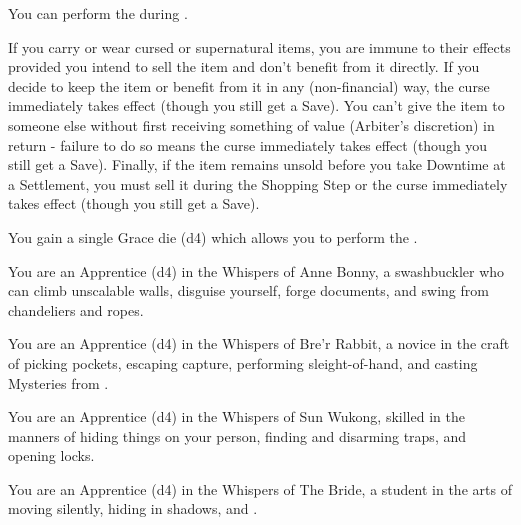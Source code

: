 \begin{multicols*}{2}

    You can perform the  during .



    If you carry or wear cursed or supernatural items, you are immune to their effects provided you intend to sell the item and don't benefit from it directly. If you decide to keep the item or benefit from it in any (non-financial) way, the curse immediately takes effect (though you still get a Save). You can’t give the item to someone else without first receiving something of value (Arbiter's discretion) in return - failure to do so means the curse immediately takes effect (though you still get a Save). Finally, if the item remains unsold before you take Downtime at a Settlement, you must sell it during the Shopping Step or the curse immediately takes effect (though you still get a Save).

   
    You gain a single Grace die (d4) which allows you to perform the .



    You are an Apprentice (d4) in the Whispers of Anne Bonny, a swashbuckler who can climb unscalable walls, disguise yourself, forge documents, and swing from chandeliers and ropes.


    You are an Apprentice (d4) in the Whispers of Bre'r Rabbit, a novice in the craft of picking pockets, escaping capture, performing sleight-of-hand, and casting Mysteries from .


\cbreak


    You are an Apprentice (d4) in the Whispers of Sun Wukong, skilled in the manners of hiding things on your person, finding and disarming traps, and opening locks.



    You are an Apprentice (d4) in the Whispers of The Bride, a student in the arts of moving silently, hiding in shadows, and .



\end{multicols*}
